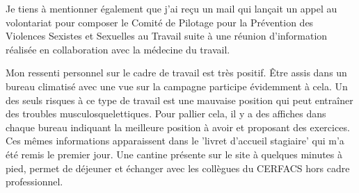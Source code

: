     Je tiens à mentionner également que j'ai reçu un mail qui lançait un appel au volontariat pour composer le Comité de Pilotage pour la Prévention des Violences Sexistes et Sexuelles au Travail suite à une réunion d'information réalisée en collaboration avec la médecine du travail.

\newpage


Mon ressenti personnel sur le cadre de travail est très positif. Être assis dans un bureau climatisé avec une vue sur la campagne participe évidemment à cela. Un des seuls risques à ce type de travail est une mauvaise position qui peut entraîner des troubles musculosquelettiques. Pour pallier cela, il y a des affiches dans chaque bureau indiquant la meilleure position à avoir et proposant des exercices. Ces mêmes informations apparaissent dans le 'livret d'accueil stagiaire' qui m'a été remis le premier jour.
Une cantine présente sur le site à quelques minutes à pied, permet de déjeuner et échanger avec les collègues du CERFACS hors cadre professionnel.